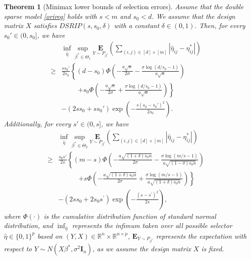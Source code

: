 \documentclass[12pt]{article}
\newtheorem{theorem}{Theorem}
\begin{document}
\begin{theorem}[Minimax lower bounds of selection errors] \label{allselectorD1D2}
Assume that the double sparse model \eqref{orireg} holds with $s<m$ and $s_0<d$. 
We assume that the design matrix $X$ satisfies $DSRIP(s,s_0, \delta)$ with a constant $\delta \in (0,1)$. 
Then, for every $ s_0' \in (0,s_0]$, we have 
\begin{equation}\label{allselectorD1}
\begin{aligned}
&\inf_{\hat \eta} \sup_{\beta^* \in {\Theta}_1} \underset{Y \sim P_{\beta^*} }{\mathbf{E}} \left( \sum_{(i,j)\in [d]\times[m]} |\hat{\eta}_{ij}  - \eta^*_{ij}| \right)\\
\ge
& \frac{ss_0'}{2s_0}\left\{ (d-s_0) {\Phi}\left(-\frac{a \sqrt n}{2\sigma}-\frac{\sigma\log(d/s_0-1)}{a\sqrt n} \right) \right.\\ 
 & \quad\quad~~ \left. + s_0 {\Phi}\left(-\frac{a \sqrt n}{2\sigma}+\frac{\sigma \log(d/s_0-1)}{a\sqrt n} \right) \right\} \\
    &-(2s s_0+ ss_0') \exp\left(-\frac{s(s_0-s_0')^2}{2s_0}\right).
\end{aligned}
\end{equation}
Additionally, for every $s' \in (0,s]$, we have
\begin{equation}\label{allselectorD2}
\begin{aligned}
&\inf_{\hat \eta} \sup_{\beta^* \in {\Theta}_2} \underset{Y \sim P_{\beta^*} }{\mathbf{E}} \left( \sum_{(i,j)\in [d]\times[m]} |\hat{\eta}_{ij}  - \eta^*_{ij}| \right)\\
\ge &\frac{s_0s'}{2s}\left\{  (m-s) {\Phi}\left(-\frac{a\sqrt{(1+\delta)s_0n}}{2\sigma} -
     \frac{\sigma \log(m/s-1)}{a\sqrt{(1-\delta)s_0 n}} \right) \right.\\
 & \quad\quad\quad\left. + s {\Phi}\left(-\frac{a\sqrt{(1+\delta)s_0n}}{2\sigma} + 
     \frac{\sigma \log(m/s-1)}{a\sqrt{(1+\delta)s_0 n}} \right) \right\} \\
    &- (2ss_0+2s_0s^\prime)\exp\left(-\frac{(s-s^\prime)^2}{2s} \right) ,
\end{aligned}
\end{equation}
where ${\Phi}(\cdot)$ is the cumulative distribution function of standard normal distribution, and $\inf_{\hat \eta}$ represents the infimum taken over all possible selector $\hat \eta \in \{ 0,1\}^p$ based on $(Y, X) \in \mathbb R^{n} \times \mathbb R^{n \times p}$, ${\mathbf{E}}_{Y \sim P_{\beta^*} }$ represents the expectation with respect to $Y \sim  N( X\beta^*, \sigma^2 \mathbf I_n)$, as we assume the design matrix $X$ is fixed.
\end{theorem}
\end{document}
